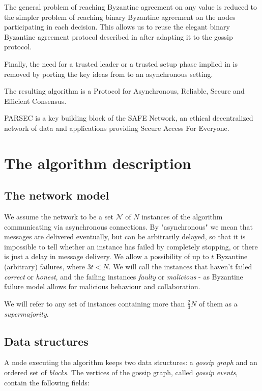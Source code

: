 \documentclass[a4paper,fleqn]{article}
\begin{document}
The general problem of reaching Byzantine agreement on any value is reduced to the simpler problem
of reaching binary Byzantine agreement on the nodes participating in each decision. This allows us
to reuse the elegant binary Byzantine agreement protocol described in \cite{aba} after adapting it
to the gossip protocol.

Finally, the need for a trusted leader or a trusted setup phase implied in \cite{aba} is removed by
porting the key ideas from \cite{trivial} to an asynchronous setting.

The resulting algorithm is a Protocol for Asynchronous, Reliable, Secure and Efficient Consensus.

PARSEC is a key building block of the SAFE Network, an ethical decentralized network of data and
applications providing Secure Access For Everyone.

\section{The algorithm description}

\subsection{The network model}

We assume the network to be a set $\mathcal{N}$ of $N$ instances of the algorithm communicating via
asynchronous connections. By "asynchronous" we mean that messages are delivered eventually,
but can be arbitrarily delayed, so that it is impossible to tell whether an instance has failed
by completely stopping, or there is just a delay in message delivery. We allow a possibility of
up to $t$ Byzantine (arbitrary) failures, where $3t < N$. We will call the instances that haven't
failed \emph{correct} or \emph{honest}, and the failing instances \emph{faulty} or \emph{malicious}
- as Byzantine failure model allows for malicious behaviour and collaboration.

We will refer to any set of instances containing more than $\frac{2}{3}N$ of them as a
\emph{supermajority}.

\subsection{Data structures}

A node executing the algorithm keeps two data structures: a \emph{gossip graph} and an
ordered set of \emph{blocks}. The vertices of the gossip graph, called \emph{gossip events},
contain the following fields:
\end{document}
